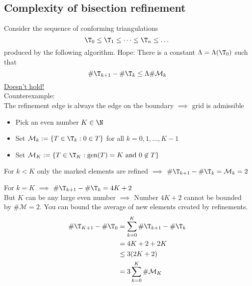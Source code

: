 \begin{enumerate}[label = \alph*)]
		\subsection{Complexity of bisection refinement}
		Consider the sequence of conforming triangulations 
		\begin{equation*}
			\T_{0} \leq \T_{1} \leq \dots \leq \T_{n} \leq \dots 
		\end{equation*}
		produced by the following algorithm.
		Hope: There is a constant $\Lambda = \Lambda(\T_{0})$ such that 
		\begin{equation*}
			\#\T_{k+1} - \#\T_{k} \leq \Lambda \# \mathcal{M}_{k}
		\end{equation*}
		\underline{Doesn't hold!}\\
		Counterexample:\\
		The refinement edge is always the edge on the boundary $\implies$ grid is admissible
		
		\begin{itemize}
			\item Pick an even number $K \in \N$ 
			\item Set $\mathcal{M}_{k} := \left\{ T \in \T_{k}: 0 \in T \right\} $ for all $k=0,1,\dots ,K-1$ 
			
			\item Set $\mathcal{M}_{K} := \left\{ T \in \T_{K}: \text{gen}(T)=K \text{ and } 0 \not\in T \right\}$ 
			
		\end{itemize}
		For $k < K$ only the marked elements are refined $\implies$ $\#\T_{k+1} - \#\T_{k} = \mathcal{M}_{k} = 2$	
		
		
		For $k=K$ $\implies$ $\#\T_{k+1} - \#\T_{k} = 4K +2$\\
		But $K$ can be any large even number $\implies$ Number $4K +2$ cannot be bounded by $\#\mathcal{M}=2$.\nl
		You can bound the average of new elements created by refinements.
		\begin{align*}
			\# \T_{K+1} - \# \T_{0} &= \sum\limits_{k=0}^{K} \# \T_{k+1} - \# \T_{k}\\
									&= 4K + 2 + 2K\\
									&\leq 3( 2K +2 )\\
									&= 3 \sum\limits_{k=0}^{K} \#\mathcal{M}_{K} 
		\end{align*}

\end{enumerate}
